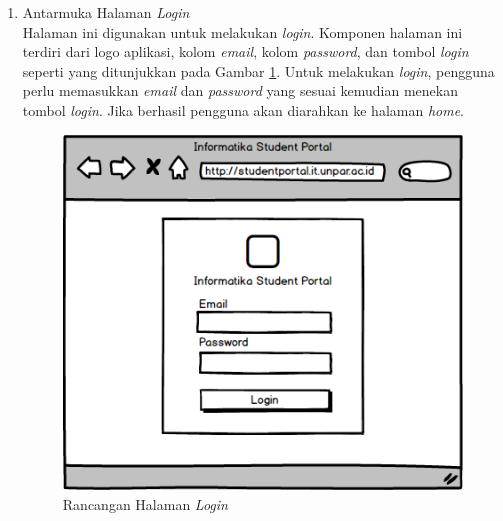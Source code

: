 \begin{enumerate}
	\item {Antarmuka Halaman \textit{Login}}\\
	Halaman ini digunakan untuk melakukan \textit{login}. Komponen halaman ini terdiri dari logo aplikasi, kolom \textit{email}, kolom \textit{password}, dan tombol \textit{login} seperti yang ditunjukkan pada Gambar \ref{fig:4_ranc_login}. Untuk melakukan \textit{login}, pengguna perlu memasukkan \textit{email} dan \textit{password} yang sesuai kemudian menekan tombol \textit{login}. Jika berhasil pengguna akan diarahkan ke halaman \textit{home}. 
		\begin{figure}[H]
			\centering
			\includegraphics[scale=0.5]{Gambar/Login_Page}
			\caption{Rancangan Halaman \textit{Login}} 
			\label{fig:4_ranc_login}
		\end{figure}
		

\end{enumerate}
